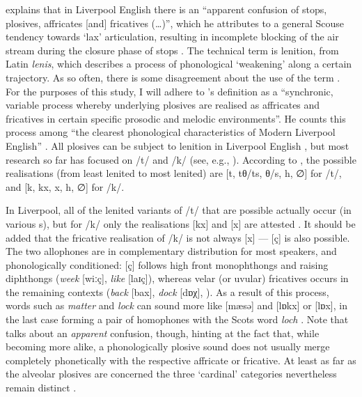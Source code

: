 \textcite[251]{knowles1973} explains that in Liverpool English there is an ``apparent confusion of stops, plosives, affricates [and] fricatives (\ldots)'', which he attributes to a general Scouse tendency towards `lax' articulation, resulting in incomplete blocking of the air stream during the closure phase of stops \parencite[cf.][107]{knowles1973}.
The technical term is lenition, from Latin \emph{lenis}, which describes a process of phonological `weakening' along a certain trajectory.
As so often, there is some disagreement about the use of the term \parencite[cf.][196]{watson2002}. For the purposes of this study, I will adhere to \citeauthor{honeybone2007}'s definition as a ``synchronic, variable process whereby underlying plosives are realised as affricates and fricatives in certain specific prosodic and melodic environments''.
He counts this process among ``the clearest phonological characteristics of Modern Liverpool English'' \citeyearpar[129]{honeybone2007}.
All plosives can be subject to lenition in Liverpool English \citep[cf.][236]{honeybone2001}, but most research so far has focused on /t/ and /k/ (see, e.g., \citealt{honeybone2001, sangster2001, watson2002, watson2006}).
According to \textcite[236]{honeybone2001}, the possible realisations (from least lenited to most lenited) are [t, tθ/ts, θ/s, h, ∅] for /t/, and [k, kx, x, h, ∅] for /k/.

In Liverpool, all of the lenited variants of /t/ that are possible actually occur (in various s), but for /k/ only the realisations [kx] and [x] are attested \parencite[cf][242]{honeybone2001}.
It should be added that the fricative realisation of /k/ is not always [x] --- [ç] is also possible.
The two allophones are in complementary distribution for most speakers, and phonologically conditioned: [ç] follows high front monophthongs and raising diphthongs (\emph{week} [wiːç], \emph{like} [laɪç]), whereas velar (or uvular) fricatives occurs in the remaining contexts (\emph{back} [bax], \emph{dock} [dɒχ], \citealp[cf.][353]{watson2007}).
As a result of this process, words such as \emph{matter} and \emph{lock} can sound more like [mæsə] and [lɒkx] or [lɒx], in the last case forming a pair of homophones with the Scots word \emph{loch} \citep[cf.][73]{trudgill1999}.
Note that \cite{knowles1973} talks about an \emph{apparent} confusion, though, hinting at the fact that, while becoming more alike, a phonologically plosive sound does not usually merge completely phonetically with the respective affricate or fricative.
At least as far as the alveolar plosives are concerned the three `cardinal' categories nevertheless remain distinct  \parencite[cf.][327 and 252--253]{knowles1973}.

